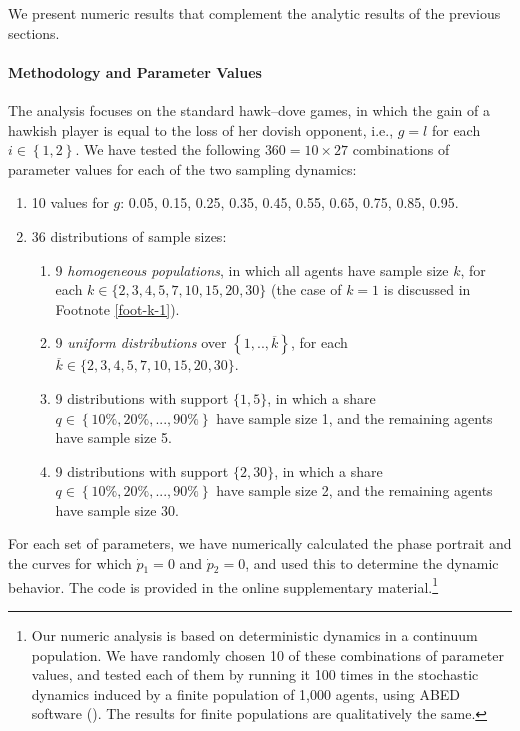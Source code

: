 \documentclass[12pt]{article}
\numberwithin{equation}{section}
\numberwithin{figure}{section}
\theoremstyle{definition}
\theoremstyle{plain}
\theoremstyle{plain}
\theoremstyle{plain}
\theoremstyle{remark}
\theoremstyle{plain}
\theoremstyle{plain}
\begin{document}
We present numeric results that complement
the analytic results of the previous sections. 


\paragraph{Methodology and Parameter Values}

The analysis focuses on the standard hawk--dove games, in which the gain of a hawkish player is equal to the loss of her dovish opponent, i.e., $g=l$
for each $i\in\left\{ 1,2\right\} $. We have tested the following $360=10 \times 27$ combinations of parameter values for each of the two sampling dynamics:
\begin{enumerate}
\item 10 values for $g$: 0.05, 0.15,
0.25, 0.35, 0.45, 0.55, 0.65, 0.75, 0.85, 0.95.
\item 36 distributions of sample sizes:
\begin{enumerate}
\item 9 \emph{homogeneous populations}, in which all agents have sample size $k$,
for each 
$k\in\{2,3,4,5,7,10,15,20,30\}$ (the case of $k=1$ is discussed in Footnote \ref{foot-k-1}). 
\item 9 \emph{uniform distributions} over $\left\{ 1,..,\overline{k}\right\} $, for each $\overline{k}\in\{2,3,4,5,7,10,15,20,30\}$.

\item 9 distributions with support $\{1,5\}$,
in which a share $q \in \left\{10\%, 20\%, ..., 90\%\right\}$ have sample size 1, and the remaining agents have sample size 5.
\item 9 distributions with support $\{2,30\}$,
in which a share $q \in \left\{10\%, 20\%, ..., 90\%\right\}$ have sample size 2, and the remaining agents have sample size 30.
\end{enumerate}
\end{enumerate}
For each set of parameters, we have numerically calculated the phase portrait and
the curves for which $\dot{p}{}_{1}=0$ and $\dot{p}{}_{2}=0$, and
used this to determine the dynamic behavior. 
The code is provided in the online supplementary material.\footnote{
Our numeric analysis is based on deterministic dynamics in a continuum population. We have randomly chosen 10 of these combinations of parameter values, and tested each of them by running it 100 times in the stochastic dynamics induced by  a finite population of 1,000 agents, using ABED software (\citealp{izquierdo2019introduction}). The results for finite populations are qualitatively the same.}
\end{document}
